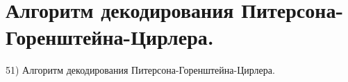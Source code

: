 \section{
 Алгоритм декодирования Питерсона-Горенштейна-Цирлера.
}

51) Алгоритм декодирования Питерсона-Горенштейна-Цирлера.

